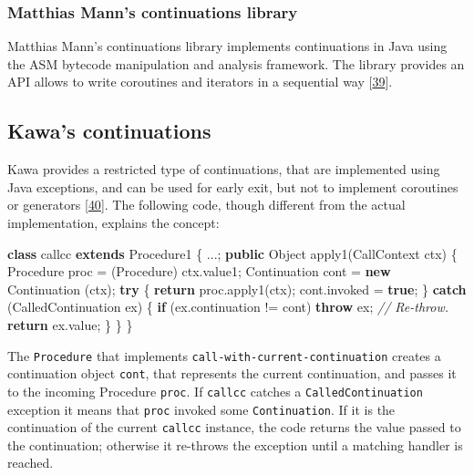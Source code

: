 \documentclass[12pt,a4paper,oneside,openright]{book}
\newenvironment{Shaded}{\begin{snugshade}}{\end{snugshade}}
\newcommand{\KeywordTok}[1]{\textcolor[rgb]{0.13,0.29,0.53}{\textbf{{#1}}}}
\newcommand{\CommentTok}[1]{\textcolor[rgb]{0.56,0.35,0.01}{\textit{{#1}}}}
\newcommand{\FunctionTok}[1]{\textcolor[rgb]{0.00,0.00,0.00}{{#1}}}
\newcommand{\NormalTok}[1]{{#1}}
\begin{document}
\subsubsection{Matthias Mann's continuations
library}\label{matthias-manns-continuations-library}

Matthias Mann's continuations library implements continuations in Java
using the ASM bytecode manipulation and analysis framework. The library
provides an API allows to write coroutines and iterators in a sequential
way {[}\hyperref[ref-ContinuationsLib2015]{39}{]}.

\subsection{Kawa's continuations}\label{kawas-continuations}

Kawa provides a restricted type of continuations, that are implemented
using Java exceptions, and can be used for early exit, but not to
implement coroutines or generators {[}\hyperref[ref-Bothner1998]{40}{]}.
The following code, though different from the actual implementation,
explains the concept:

\begin{Shaded}
\begin{Highlighting}[]
    \KeywordTok{class} \NormalTok{callcc }\KeywordTok{extends} \NormalTok{Procedure1 \{}
        \NormalTok{...;}
        \KeywordTok{public} \NormalTok{Object }\FunctionTok{apply1}\NormalTok{(CallContext ctx) \{}
            \NormalTok{Procedure proc = (Procedure) ctx.}\FunctionTok{value1}\NormalTok{;}
            \NormalTok{Continuation cont}
                \NormalTok{= }\KeywordTok{new} \FunctionTok{Continuation} \NormalTok{(ctx);}
            \KeywordTok{try} \NormalTok{\{}
                \KeywordTok{return} \NormalTok{proc.}\FunctionTok{apply1}\NormalTok{(ctx);}
                \NormalTok{cont.}\FunctionTok{invoked} \NormalTok{= }\KeywordTok{true}\NormalTok{;}
            \NormalTok{\} }\KeywordTok{catch} \NormalTok{(CalledContinuation ex) \{}
                \KeywordTok{if} \NormalTok{(ex.}\FunctionTok{continuation} \NormalTok{!= cont)}
                    \KeywordTok{throw} \NormalTok{ex;  }\CommentTok{// Re-throw.}
                \KeywordTok{return} \NormalTok{ex.}\FunctionTok{value}\NormalTok{;}
            \NormalTok{\}}
        \NormalTok{\}}
    \NormalTok{\}}
\end{Highlighting}
\end{Shaded}

The \texttt{Procedure} that implements
\texttt{call-with-current-continuation} creates a continuation object
\texttt{cont}, that represents the current continuation, and passes it
to the incoming Procedure \texttt{proc}. If \texttt{callcc} catches a
\texttt{CalledContinuation} exception it means that \texttt{proc}
invoked some \texttt{Continuation}. If it is the continuation of the
current \texttt{callcc} instance, the code returns the value passed to
the continuation; otherwise it re-throws the exception until a matching
handler is reached.
\end{document}
